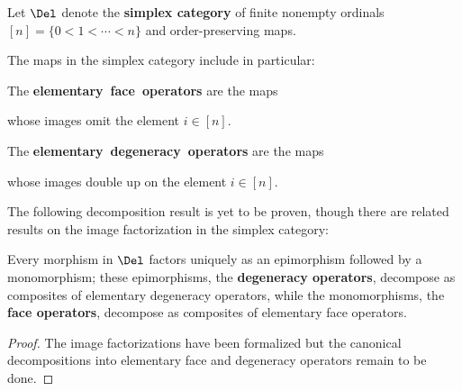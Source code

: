 \begin{definition}\label{defn:simplex-category}
 \leanok
  Let $\Del$ denote the \textbf{simplex category} of finite nonempty ordinals $[n] = \{0 <1 <\cdots < n\}$ and order-preserving maps.
\end{definition}

The maps in the simplex category include in particular:

\begin{definition}\label{defn:face-map}
  \leanok
{}
The \textbf{elementary~face~operators} are the maps
\begin{center}
\end{center}
whose images omit the element $i \in [n]$.
\end{definition}

\begin{definition}\label{defn:degeneracy-map}
  \leanok
  The \textbf{elementary~degeneracy~operators} are the maps
\begin{center}
\end{center}
whose images  double up on the element $i \in [n]$.
\end{definition}

The following decomposition result is yet to be proven, though there are related results on the image factorization in the simplex category:

\begin{proposition}\label{prop:simplex-cat-factorization}
   Every morphism in $\Del$ factors uniquely as an epimorphism followed by a monomorphism; these epimorphisms, the \textbf{degeneracy operators}, decompose as composites of elementary degeneracy operators, while the monomorphisms, the \textbf{face operators}, decompose as composites of elementary face operators.
\end{proposition}
\begin{proof}
  The image factorizations have been formalized but the canonical decompositions into elementary face and degeneracy operators remain to be done.
\end{proof}

